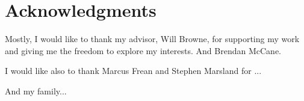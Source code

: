 \chapter*{Acknowledgments}\label{C:ack}

Mostly, I would like to thank my advisor, Will Browne, for supporting my work and giving me the freedom to explore my interests.
And Brendan McCane.

I would like also to thank Marcus Frean and Stephen Marsland for ...

And my family...


